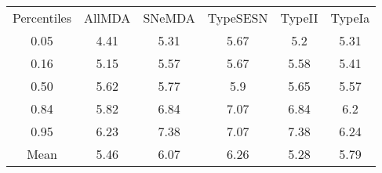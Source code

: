 \begin{table}
\begin{tabular}{cccccc}
Percentiles & AllMDA & SNeMDA & TypeSESN & TypeII & TypeIa \\
0.05 & 4.41 & 5.31 & 5.67 & 5.2 & 5.31 \\
0.16 & 5.15 & 5.57 & 5.67 & 5.58 & 5.41 \\
0.50 & 5.62 & 5.77 & 5.9 & 5.65 & 5.57 \\
0.84 & 5.82 & 6.84 & 7.07 & 6.84 & 6.2 \\
0.95 & 6.23 & 7.38 & 7.07 & 7.38 & 6.24 \\
Mean & 5.46 & 6.07 & 6.26 & 5.28 & 5.79 \\
\end{tabular}
\end{table}
